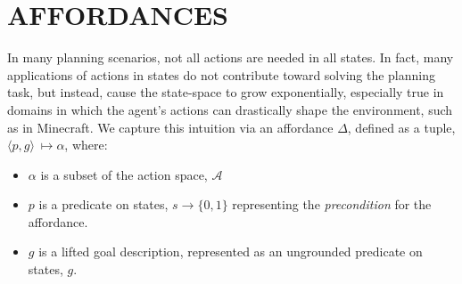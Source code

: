 \documentclass[]{article}
\begin{document}



\section{AFFORDANCES}
\label{sec:affordances}


In many planning scenarios, not all actions are needed in all
states. In fact, many applications of actions in states do not
contribute toward solving the planning task, but instead, cause the
state-space to grow exponentially, especially true in domains in which
the agent's actions can drastically shape the environment, such as in
Minecraft. We capture this intuition via an affordance $\Delta$, defined 
as a tuple, $\langle p,g\rangle\ \longmapsto \alpha$,
where:
\begin{itemize}
\item[] $\alpha$ is a subset of the action space, $\mathcal{A}$
\item[] $p$ is a predicate on states, $s \longrightarrow \{$0$, 1\}$
  representing the {\em precondition} for the affordance.
\item[] $g$ is a lifted goal description, represented as an ungrounded predicate on states, $g$.
\end{itemize}
\end{document}
